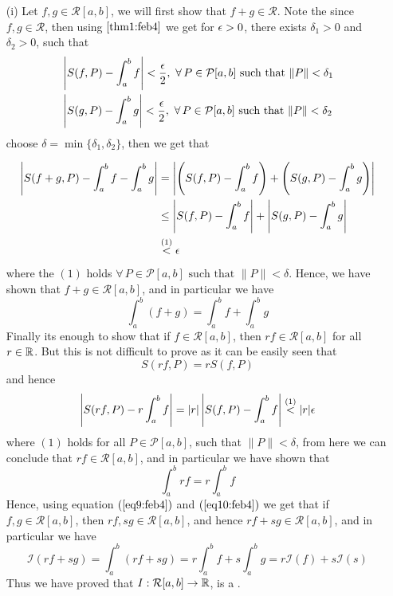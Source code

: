 \begin{prf}
\begin{enumerate}
    \item[(i)] Let $f,g \in \mathcal{R}[a,b]$, we will first show that $f+g \in \mathcal{R}$. Note the since $f,g \in \mathcal{R}$, then using  $\ref{thm1:feb4}$ we get for $\epsilon > 0$, there exists $\delta_1 > 0$ and $\delta_2 > 0$, such that 
    \begin{align*}
        &\left|S(f,P) - \int_a^b f \right| < \frac{\eps}{2}, \ \forall \, P \in \mathcal{P}[a,b] \mbox{ such that } \|P\| < \delta_1 \\ &\left|S(g,P) - \int_a^b g\right| < \frac{\eps}{2}, \ \forall \, P \in \mathcal{P}[a,b] \mbox{ such that } \|P\| < \delta_2 
    \end{align*}
    choose $\delta = \min \{\delta_1,\delta_2\}$, then we get that 

    \begin{align*}
        \left| S(f+g, P) - \int_a^b f - \int_a^b g \right| &= \left| \left(S(f,P) - \int_a^b f \right) + \left( S(g,P) - \int_a^b g \right) \right| \\ 
        &\leq \left| S(f,P) - \int_a^b f \right| + \left| S(g,P) - \int_a^b g \right| \\ 
        &\overset{(1)}{<} \epsilon 
    \end{align*}
    where the $(1)$ holds $\forall \, P \in \mathcal{P}[a,b] \mbox{ such that } \|P\| < \delta$. Hence, we have shown that $f+g \in \mathcal{R}[a,b]$, and in particular we have 
    \begin{equation}\label{eq9:feb4}
        \int_a^b (f+g) = \int_a^b f + \int_a^b g 
    \end{equation}
    Finally its enough to show that if $f \in \mathcal{R}[a,b]$, then $rf \in \mathcal{R}[a,b]$ for all $r \in \mathbb{R}$. But this is not difficult to prove as it can be easily seen that 
    \[
        S(rf,P) = rS(f,P)    
    \]
    and hence 
    \begin{align*}
        \left| S(rf,P) - r \int_a^b f \right| = |r|\left| S(f,P) - \int_a^b f \right| \overset{(1)}{<} |r|\epsilon
    \end{align*}
    where $(1)$ holds for all $P \in \mathcal{P}[a,b]$, such that $\|P\| < \delta$, from here we can conclude that $rf \in \mathcal{R}[a,b]$, and in particular we have shown that
    \begin{equation}\label{eq10:feb4}
        \int_a^b rf = r \int_a^b f  
    \end{equation} 
    Hence, using equation $(\ref{eq9:feb4})$ and $(\ref{eq10:feb4})$ we get that if $f,g \in \mathcal{R}[a,b]$, then $rf,sg \in \mathcal{R}[a,b]$, and hence $rf+sg \in \mathcal{R}[a,b]$, and in particular we have 
    \[
        \mathcal{I}(rf+sg) = \int_a^b (rf+sg) = r\int_a^b f + s \int_a^b g = r\mathcal{I}(f) + s\mathcal{I}(s)
    \]
    Thus we have proved that $I : \mathcal{R}[a,b] \to \mathbb{R}$, is a .


\end{enumerate}
\end{prf}
